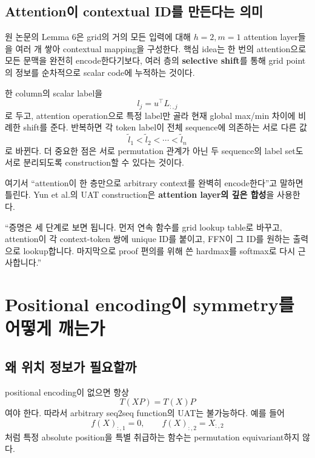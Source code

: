 \documentclass[11pt,a4paper,oneside,openany]{memoir}
\theoremstyle{definition}
\begin{document}
\section{Attention이 contextual ID를 만든다는 의미}

원 논문의 Lemma 6은 grid의 거의 모든 입력에 대해 $h=2,m=1$ attention layer들을 여러 개 쌓아 contextual mapping을 구성한다.
핵심 idea는 한 번의 attention으로 모든 문맥을 완전히 encode한다기보다,
여러 층의 \textbf{selective shift}를 통해 grid point의 정보를 순차적으로 scalar code에 누적하는 것이다.

한 column의 scalar label을
\[
l_j=u^\top L_{:,j}
\]
로 두고, attention operation으로 특정 label만 골라 현재 global max/min 차이에 비례한 shift를 준다.
반복하면 각 token label이 전체 sequence에 의존하는 서로 다른 값
\[
\tilde l_1<\tilde l_2<\cdots<\tilde l_n
\]
로 바뀐다. 더 중요한 점은 서로 permutation 관계가 아닌 두 sequence의 label set도 서로 분리되도록 construction할 수 있다는 것이다.

\begin{warningbox}
여기서 ``attention이 한 층만으로 arbitrary context를 완벽히 encode한다''고 말하면 틀린다.
Yun et al.의 UAT construction은 \textbf{attention layer의 깊은 합성}을 사용한다.
\end{warningbox}

\begin{presentbox}
``증명은 세 단계로 보면 됩니다. 먼저 연속 함수를 grid lookup table로 바꾸고, attention이 각 context-token 쌍에 unique ID를 붙이고,
FFN이 그 ID를 원하는 출력으로 lookup합니다. 마지막으로 proof 편의를 위해 쓴 hardmax를 softmax로 다시 근사합니다.''
\end{presentbox}

\chapter{Positional encoding이 symmetry를 어떻게 깨는가}

\section{왜 위치 정보가 필요할까}

positional encoding이 없으면 항상
\[
T(XP)=T(X)P
\]
여야 한다. 따라서 arbitrary seq2seq function의 UAT는 불가능하다.
예를 들어
\[
f(X)_{:,1}=0,
\qquad
f(X)_{:,2}=X_{:,2}
\]
처럼 특정 absolute position을 특별 취급하는 함수는 permutation equivariant하지 않다.
\end{document}
